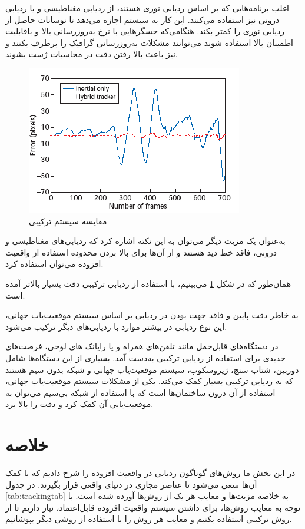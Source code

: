 اغلب برنامه‌هایی که بر اساس ردیابی نوری هستند، از ردیابی مغناطیسی و یا ردیابی درونی نیز استفاده می‌کنند. این کار به سیستم اجازه می‌دهد تا نوسانات حاصل از ردیابی نوری را کمتر بکند. هنگامی‌که حسگرهایی با نرخ به‌روزرسانی بالا و باقابلیت اطمینان بالا استفاده شوند می‌توانند مشکلات به‌روزرسانی گرافیک را برطرف بکنند و نیز باعث بالا رفتن دقت در محاسبات ژست بشوند.
\begin{figure}
	\centering
	\includegraphics[width=1\linewidth]{image/hybrid}
	\caption {مقایسه سیستم ترکیبی\cite{pokemongo}}
	\label{fig:hybrid}
\end{figure}

به‌عنوان یک مزیت دیگر می‌توان به این نکته اشاره کرد که ردیابی‌های مغناطیسی و درونی، فاقد خط دید هستند و از آن‌ها برای بالا بردن محدوده استفاده از واقعیت افزوده می‌توان استفاده کرد. 

همان‌طور که در شکل \ref{fig:hybrid} می‌بینیم، با استفاده از ردیابی ترکیبی دقت بسیار بالاتر آمده است.

به خاطر دقت پایین و فاقد جهت بودن در ردیابی بر اساس سیستم موقعیت‌یاب جهانی، این نوع ردیابی در بیشتر موارد با ردیابی‌های دیگر ترکیب می‌شود.

در دستگاه‌های قابل‌حمل مانند تلفن‌های همراه و یا رایانک های لوحی، فرصت‌های جدیدی برای استفاده از ردیابی ترکیبی به‌دست آمد. بسیاری از این دستگاه‌ها شامل دوربین، شتاب سنج، ژیروسکوپ، سیستم موقعیت‌یاب جهانی و شبکه بدون سیم هستند که به ردیابی ترکیبی بسیار کمک می‌کند. یکی از مشکلات سیستم موقعیت‌یاب جهانی، استفاده از آن درون ساختمان‌ها است که با استفاده از شبکه بی‌سیم می‌توان به موقعیت‌یابی آن کمک کرد و دقت را بالا برد.
\section{خلاصه}
در این بخش ما روش‌های گوناگون ردیابی در واقعیت افزوده را شرح دادیم که با کمک آن‌ها سعی می‌شود تا عناصر مجازی در دنیای واقعی قرار بگیرند. در جدول \ref{tab:trackingtab} به خلاصه مزیت‌ها و معایب هر یک از روش‌ها آورده شده است.
با توجه به معایب روش‌ها، برای داشتن سیستم واقعیت افزوده قابل‌اعتماد، نیاز داریم تا از روش ترکیبی استفاده بکنیم و معایب هر روش را با استفاده از روشی دیگر بپوشانیم.


